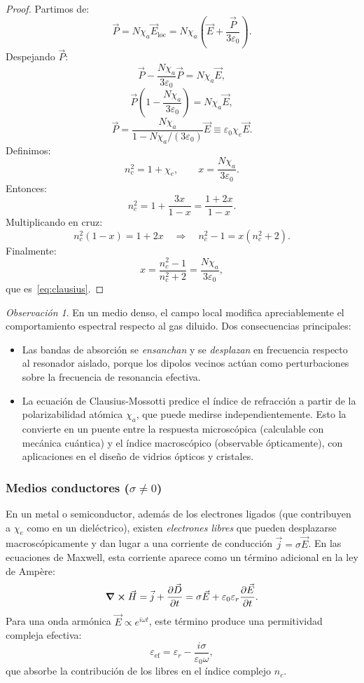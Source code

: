 \documentclass[12pt, a4paper]{article}
\theoremstyle{plain}
\theoremstyle{definition}
\theoremstyle{remark}
\newtheorem*{observacion}{Observación}
\newcommand{\ve}[1]{\vec{#1}}
\begin{document}
\begin{proof}
Partimos de:
\[
  \ve{P}
  = N\chi_a\ve{E}_\text{loc}
  = N\chi_a\left(\ve{E}+\frac{\ve{P}}{3\varepsilon_0}\right).
\]
Despejando $\ve{P}$:
\[
  \ve{P} - \frac{N\chi_a}{3\varepsilon_0}\ve{P} = N\chi_a\ve{E},
\]
\[
  \ve{P}\left(1-\frac{N\chi_a}{3\varepsilon_0}\right)=N\chi_a\ve{E},
\]
\[
  \ve{P} = \frac{N\chi_a}{1 - N\chi_a/(3\varepsilon_0)}\ve{E}
  \equiv \varepsilon_0\chi_e\ve{E}.
\]
Definimos:
\[
  n_c^2 = 1+\chi_e,
  \qquad
  x = \frac{N\chi_a}{3\varepsilon_0}.
\]
Entonces:
\[
  n_c^2 = 1 + \frac{3x}{1-x} = \frac{1+2x}{1-x}.
\]
Multiplicando en cruz:
\[
  n_c^2(1-x)=1+2x
  \quad\Rightarrow\quad
  n_c^2-1=x(n_c^2+2).
\]
Finalmente:
\[
  x=\frac{n_c^2-1}{n_c^2+2}
  =\frac{N\chi_a}{3\varepsilon_0},
\]
que es~\eqref{eq:clausius}.
\end{proof}

\begin{observacion}
En un medio denso, el campo local modifica apreciablemente el comportamiento
espectral respecto al gas diluido. Dos consecuencias principales:
\begin{itemize}
  \item Las bandas de absorción se \emph{ensanchan} y se \emph{desplazan}
        en frecuencia respecto al resonador aislado, porque los dipolos
        vecinos actúan como perturbaciones sobre la frecuencia de resonancia
        efectiva.
  \item La ecuación de Clausius-Mossotti predice el índice de refracción a
        partir de la polarizabilidad atómica $\chi_a$, que puede medirse
        independientemente. Esto la convierte en un puente entre la respuesta
        microscópica (calculable con mecánica cuántica) y el índice macroscópico
        (observable ópticamente), con aplicaciones en el diseño de vidrios
        ópticos y cristales.
\end{itemize}
\end{observacion}

\subsubsection{Medios conductores \texorpdfstring{($\sigma\neq 0$)}{(sigma != 0)}}

En un metal o semiconductor, además de los electrones ligados (que contribuyen
a $\chi_e$ como en un dieléctrico), existen \emph{electrones libres} que pueden
desplazarse macroscópicamente y dan lugar a una corriente de conducción
$\ve{j} = \sigma\ve{E}$. En las ecuaciones de Maxwell, esta corriente aparece
como un término adicional en la ley de Ampère:
\[
  \curl\ve{H} = \ve{j} + \pdv{\ve{D}}{t}
  = \sigma\ve{E} + \varepsilon_0\varepsilon_r\pdv{\ve{E}}{t}.
\]
Para una onda armónica $\ve{E} \propto e^{i\omega t}$, este término produce
una permitividad compleja efectiva:
\[
  \varepsilon_\text{ef} = \varepsilon_r - \frac{i\sigma}{\varepsilon_0\omega},
\]
que absorbe la contribución de los libres en el índice complejo $n_c$.
\end{document}
